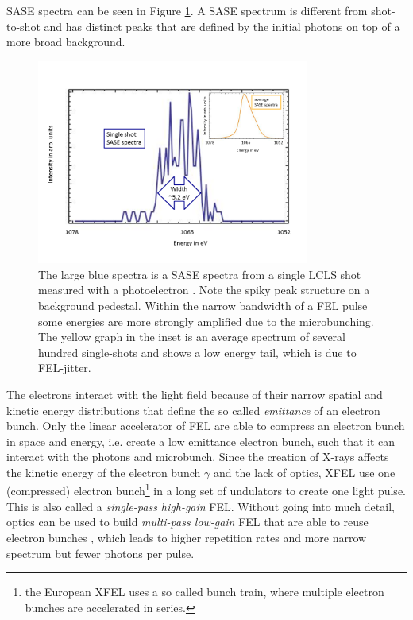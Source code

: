 SASE spectra can be seen in Figure \ref{fig:SASE-spectra}. A SASE spectrum is different from shot-to-shot and has distinct peaks that are defined by the initial photons on top of a more broad background.
\begin{figure}
	\centering
		\includegraphics[width=0.80\textwidth]{images/SASE-spectra.png}
	\caption[SASE single-shot and average spectra]{The large blue spectra is a SASE spectra from a single LCLS shot measured with a photoelectron \citep[see][]{Bucher-2014-Unpublished}. Note the spiky peak structure on a background pedestal. Within the narrow bandwidth of a FEL pulse some energies are more strongly amplified due to the microbunching. The yellow graph in the inset is an average spectrum of several hundred single-shots and shows a low energy tail, which is due to FEL-jitter.}
	\label{fig:SASE-spectra}
\end{figure}
The electrons interact with the light field because of their narrow spatial and kinetic energy distributions that define the so called \textit{emittance} of an electron bunch. Only the linear accelerator of FEL are able to compress an electron bunch in space and energy, i.e. create a low emittance electron bunch, such that it can interact with the photons and microbunch. Since the creation of X-rays affects the kinetic energy of the electron bunch $\gamma$ and the lack of optics, XFEL use one (compressed) electron bunch\footnote{the European XFEL uses a so called bunch train, where multiple electron bunches are accelerated in series.} in a long set of undulators to create one light pulse. This is also called a \textit{single-pass high-gain} FEL. Without going into much detail, optics can be used to build \textit{multi-pass low-gain} FEL that are able to reuse electron bunches \citep{Kim-2008-PRL}, which leads to higher repetition rates and more narrow spectrum but fewer photons per pulse.
%
%
%
%
